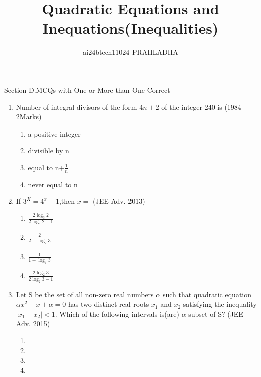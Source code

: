 \documentclass[journal,12pt,twocolumn]{IEEEtran}
\theoremstyle{remark}
\begin{document}

\vspace{3cm}
\title{Quadratic Equations and Inequations(Inequalities)}
\author{ai24btech11024 PRAHLADHA%
}
\maketitle
\newpage
\bigskip
\renewcommand{\thefigure}{\theenumi}
\renewcommand{\thetable}{\theenumi}
\maketitle\Large{Section D.MCQs with One or More than One Correct}
\begin{enumerate}[start=13]\large
 \item Number of integral divisors of the form $4n+2$ of the integer 240 is        \hfill (1984-2Marks)
 \begin{multicols}{2}
 \begin{enumerate}
     \item a positive integer
     \item divisible by n
     \item equal to n+$\frac{1}{n}$
     \item never equal to n
 \end{enumerate}
 \end{multicols}
 \item If $3^X=4^x-1$,then $x=$ \hfill (JEE Adv. 2013)
 \begin{multicols}{2}
 \begin{enumerate}
     \item $\frac{2\log_3 2}{2\log_3 2-1}$
     \item $\frac{2}{2-\log_2 3}$
     \item $\frac{1}{1-\log_4 3}$
     \item $\frac{2\log_2 3}{2\log_2 3-1}$
 \end{enumerate}
 \end{multicols}
 \item Let S be the set of all non-zero real numbers \(\alpha\) such that quadratic equation $\alpha x^2-x+\alpha=0$ has two distinct real roots $x_1$ and $x_2$ satisfying the inequality$|x_1-x_2|<1$. Which of the following intervals is(are) $\alpha$ subset of S? \hfill (JEE Adv. 2015)
 \begin{multicols}{2}
 \begin{enumerate}
     \item {}
     \item {}
     \item {}
    \item {}
 \end{enumerate}
 \end{multicols}
 \end{enumerate}
\end{document}
